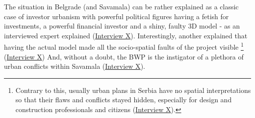 \documentclass[11pt]{report}
\begin{document}
The situation in Belgrade (and Savamala) can be rather explained as a classic case of investor urbanism with powerful political figures having a fetish for investments, a powerful financial investor and a shiny, faulty 3D model - as an interviewed expert explained 
(\href{InterviewX}{Interview X}).
Interestingly, another explained that having the actual model made all the socio-spatial faults of the project visible
\footnote{Contrary to this, usually urban plans in Serbia have no spatial interpretations so that their flaws and conflicts stayed hidden, especially for design and construction professionals and citizens (\href{InterviewX}{Interview X}).}
(\href{InterviewX}{Interview X})
And, without a doubt, the BWP is the instigator of a plethora of urban conflicts within Savamala (\href{InterviewX}{Interview X}).
\\
\end{document}
